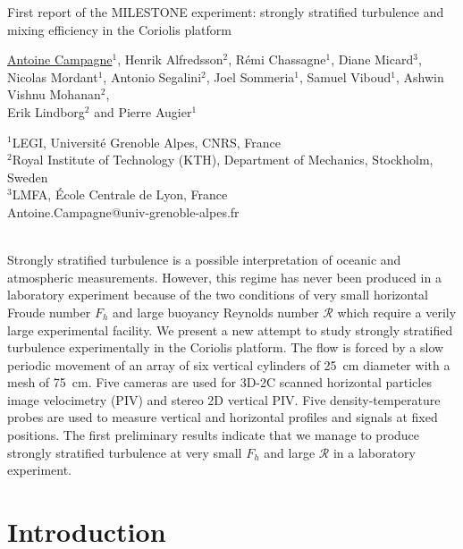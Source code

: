 \documentclass[a4paper, 12pt, times]{article}
\renewcommand{\abstract}[0]{\noindent {\sect Abstract} \vspace{5pt}\\}
\newcommand{\R}{\mathcal{R}}
\begin{document}
\begin{center} 

{\tit First report of the MILESTONE experiment: strongly stratified turbulence
and mixing efficiency in the Coriolis platform}\\ %

\vspace{10pt}

{\auth \underline{Antoine Campagne}$^{1}$, Henrik Alfredsson$^{2}$, R\'emi Chassagne$^{1}$, Diane
Micard$^{3}$, Nicolas Mordant$^{1}$, Antonio Segalini$^{2}$, Joel
Sommeria$^{1}$, Samuel Viboud$^{1}$, Ashwin Vishnu Mohanan$^{2}$,\\ Erik
Lindborg$^{2}$ and Pierre Augier$^{1}$}\\ %


\vspace{10pt}

{$^{1}$LEGI, Universit\'{e} Grenoble Alpes, CNRS, France}\\
{$^{2}$Royal Institute of Technology (KTH), Department of Mechanics, Stockholm, Sweden}\\
{$^{3}$LMFA, \'Ecole Centrale de Lyon, France}\\

Antoine.Campagne@univ-grenoble-alpes.fr
\end{center}

\abstract 

\noindent Strongly stratified turbulence is a possible interpretation of oceanic and
atmospheric measurements. However, this regime has never been produced in a
laboratory experiment because of the two conditions of very small horizontal
Froude number $F_h$ and large buoyancy Reynolds number $\R$ which require a verily large experimental facility. We
present a new attempt to study strongly stratified turbulence experimentally in
the Coriolis platform. The flow is forced by a slow periodic movement of an
array of six vertical cylinders of 25\ cm diameter with a mesh of 75\ cm.
%
Five cameras are used for 3D-2C scanned horizontal particles image velocimetry
(PIV) and stereo 2D vertical PIV.  Five density-temperature probes are used to
measure vertical and horizontal profiles and signals at fixed positions.
%
The first preliminary results indicate that we manage to produce strongly
stratified turbulence at very small $F_h$ and large $\R$ in a laboratory
experiment.


\section{Introduction} 
\end{document}
